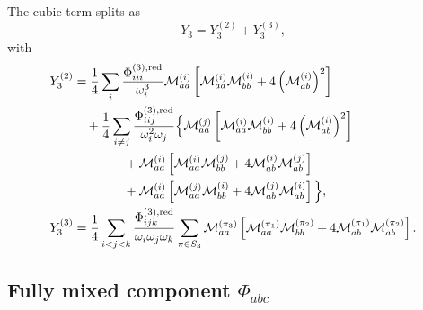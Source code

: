The cubic term splits as
\begin{equation}
Y_3 = Y_3^{(2)} + Y_3^{(3)},
\end{equation}
with
\begin{align}
Y_3^{(2)}
&=
\frac{1}{4}\sum_i
\frac{\Phi^{(3),\mathrm{red}}_{iii}}{\omega_i^3}
\mathcal{M}^{(i)}_{aa}
\left[
\mathcal{M}^{(i)}_{aa}\mathcal{M}^{(i)}_{bb}
+4\left(\mathcal{M}^{(i)}_{ab}\right)^2
\right]
\notag\\
&\quad
+\frac{1}{4}\sum_{i\neq j}
\frac{\Phi^{(3),\mathrm{red}}_{iij}}{\omega_i^2\omega_j}
\Big\{
\mathcal{M}^{(j)}_{aa}
\left[
\mathcal{M}^{(i)}_{aa}\mathcal{M}^{(i)}_{bb}
+4\left(\mathcal{M}^{(i)}_{ab}\right)^2
\right]
\notag\\
&\qquad\qquad
+\mathcal{M}^{(i)}_{aa}
\left[
\mathcal{M}^{(i)}_{aa}\mathcal{M}^{(j)}_{bb}
+4\mathcal{M}^{(i)}_{ab}\mathcal{M}^{(j)}_{ab}
\right]
\notag\\
&\qquad\qquad
+\mathcal{M}^{(i)}_{aa}
\left[
\mathcal{M}^{(j)}_{aa}\mathcal{M}^{(i)}_{bb}
+4\mathcal{M}^{(j)}_{ab}\mathcal{M}^{(i)}_{ab}
\right]
\Big\},
\\
Y_3^{(3)}
&=
\frac{1}{4}\sum_{i<j<k}
\frac{\Phi^{(3),\mathrm{red}}_{ijk}}{\omega_i\omega_j\omega_k}
\sum_{\pi\in S_3}
\mathcal{M}^{(\pi_3)}_{aa}
\left[
\mathcal{M}^{(\pi_1)}_{aa}\mathcal{M}^{(\pi_2)}_{bb}
+4\mathcal{M}^{(\pi_1)}_{ab}\mathcal{M}^{(\pi_2)}_{ab}
\right].
\end{align}

\subsection*{Fully mixed component $\Phi_{abc}$}

